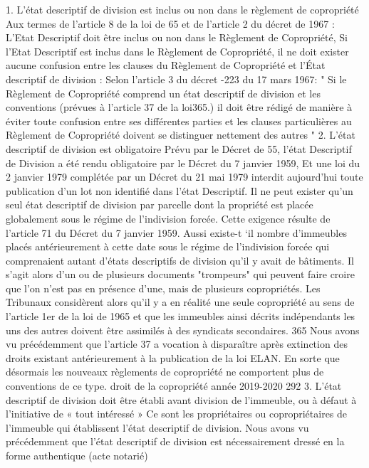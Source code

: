 		1. L’état descriptif de division est inclus ou non dans le règlement de copropriété
		Aux termes de l'article 8 de la loi de 65 et de l'article 2 du décret de 1967 : L'Etat Descriptif doit être inclus ou non dans le Règlement de Copropriété,
		Si l'Etat Descriptif est inclus dans le Règlement de Copropriété, il ne doit exister aucune confusion entre les clauses du Règlement de Copropriété et l'État descriptif de division :
		Selon l'article 3 du décret -223 du 17 mars 1967:
		" Si le Règlement de Copropriété comprend un état descriptif de division et les conventions (prévues à l'article 37 de la loi365.) il doit être rédigé de manière à éviter toute confusion entre ses différentes parties et les clauses particulières au Règlement de Copropriété doivent se distinguer nettement des autres "
		2. L’état descriptif de division est obligatoire
		Prévu par le Décret de 55, l'état Descriptif de Division a été rendu obligatoire par le Décret du 7 janvier 1959, Et une loi du 2 janvier 1979 complétée par un Décret du 21 mai 1979 interdit aujourd'hui toute publication d'un lot non identifié dans l'état Descriptif.
		Il ne peut exister qu'un seul état descriptif de division par parcelle dont la propriété est placée globalement sous le régime de l'indivision forcée. Cette exigence résulte de l'article 71 du Décret du 7 janvier 1959.
		Aussi existe-t ‘il nombre d'immeubles placés antérieurement à cette date sous le régime de l'indivision forcée qui comprenaient autant d’états descriptifs de division qu'il y avait de bâtiments. Il s'agit alors d'un ou de plusieurs documents "trompeurs" qui peuvent faire croire que l'on n'est pas en présence d'une, mais de plusieurs copropriétés. Les Tribunaux considèrent alors qu'il y a en réalité une seule copropriété au sens de l'article 1er de la loi de 1965 et que les immeubles ainsi décrits indépendants les uns des autres doivent être assimilés à des syndicats secondaires.
		365 Nous avons vu précédemment que l’article 37 a vocation à disparaître après extinction des droits existant antérieurement à la publication de la loi ELAN. En sorte que désormais les nouveaux règlements de copropriété ne comportent plus de conventions de ce type.
		droit de la copropriété année 2019-2020
		292
		3. L’état descriptif de division doit être établi avant division de l’immeuble, ou à défaut à l’initiative de « tout intéressé »
		Ce sont les propriétaires ou copropriétaires de l'immeuble qui établissent l'état descriptif de division.
		Nous avons vu précédemment que l'état descriptif de division est nécessairement dressé en la forme authentique (acte notarié)
